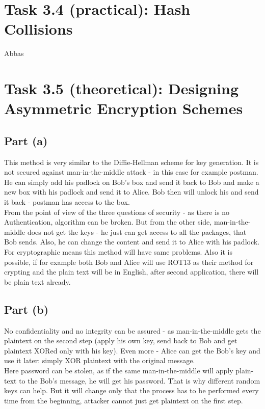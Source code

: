 \documentclass{article}
\begin{document}
\section*{Task 3.4 (practical): Hash Collisions}
Abbas

\section*{Task 3.5 (theoretical): Designing Asymmetric Encryption Schemes}
\subsection*{Part (a)}
This method is very similar to the Diffie-Hellman scheme for key generation. It is not secured against man-in-the-middle attack - in this case for example postman. He can simply add his padlock on Bob's box and send it back to Bob and make a new box with his padlock and send it to Alice. Bob then will unlock his and send it back - postman has access to the box. 
\\
From the point of view of the three questions of security - as there is no Authentication, algorithm can be broken. But from the other side, man-in-the-middle does not get the keys - he just can get access to all the packages, that Bob sends. Also, he can change the content and send it to Alice with his padlock.
\\
For cryptographic means this method will have same problems. Also it is possible, if for example both Bob and Alice will use ROT13 as their method for crypting and the plain text will be in English, after second application, there will be plain text already.

\subsection*{Part (b)}
No confidentiality and no integrity can be assured - as man-in-the-middle gets the plaintext on the second step (apply his own key, send back to Bob and get plaintext XORed only with his key). Even more - Alice can get the Bob's key and use it later: simply XOR plaintext with the original message.
\\
Here password can be stolen, as if the same man-in-the-middle will apply plain-text to the Bob's message, he will get his password. That is why different random keys can help. But it will change only that the process has to be performed every time from the beginning, attacker cannot just get plaintext on the first step.
\end{document}
